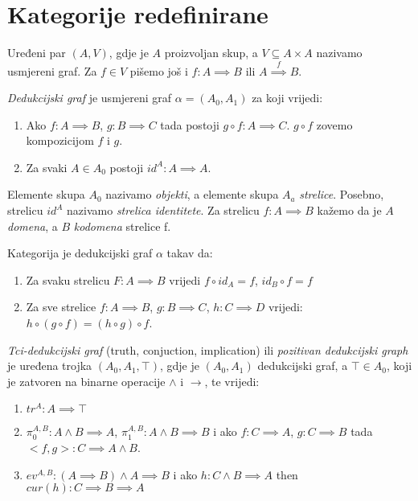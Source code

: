 \section{Kategorije redefinirane}

\begin{definition}
  Uređeni par $(A, V)$, gdje je $A$ proizvoljan skup, a $V \subseteq A \times A$ nazivamo usmjereni graf. Za $f \in V$ pišemo još i $f : A \implies B$ ili $A \overset{f}{\implies} B$.
\end{definition}

\begin{definition}
  \emph{Dedukcijski graf} je usmjereni graf $\alpha = (A_0, A_1)$ za koji vrijedi:
  \begin{enumerate}
    \item Ako $f : A \implies B$, $g: B \implies C$ tada postoji $g \circ f : A \implies C$. $g \circ f$ zovemo kompozicijom $f$ i $g$.
    \item Za svaki $A \in A_0$ postoji $id^A : A \implies A$.
  \end{enumerate}

  Elemente skupa $A_0$ nazivamo \emph{objekti}, a elemente skupa $A_a$ \emph{strelice}. Posebno, strelicu $id^A$ nazivamo \emph{strelica identitete}. Za strelicu $f : A \implies B$ kažemo da je $A$ \emph{domena}, a $B$ \emph{kodomena} strelice f.
\end{definition}

\begin{definition}
  Kategorija je dedukcijski graf $\alpha$ takav da:
  \begin{enumerate}
    \item Za svaku strelicu $F : A \implies B$ vrijedi $f \circ id_A = f$, $id_B \circ f = f$
    \item Za sve strelice $f : A \implies B$, $g : B \implies C$, $h : C \implies D$ vrijedi: $h \circ (g \circ f) = (h \circ g) \circ f$.
  \end{enumerate}
\end{definition}


\begin{definition}
  \emph{Tci-dedukcijski graf} (truth, conjuction, implication) ili \emph{pozitivan dedukcijski graph} je uređena trojka $(A_0, A_1, \top)$, gdje je $(A_0, A_1)$ dedukcijski graf, a $\top \in A_0$, koji je zatvoren na binarne operacije $\land$ i $\to$, te vrijedi:
    \begin{enumerate}
      \item $tr^A : A \implies \top$ 
      \item $\pi^{A, B}_0 : A \land B \implies A$, $\pi^{A, B}_1 : A \land B \implies B$ i ako $f : C \implies A$, $g : C \implies B$ tada $<f, g> : C \implies A \land B$.
      \item $ev^{A, B} : (A \implies B) \land A \implies B$ i ako $h : C \land B \implies A$ then $cur(h): C \implies B \implies A$
    \end{enumerate}
\end{definition}

